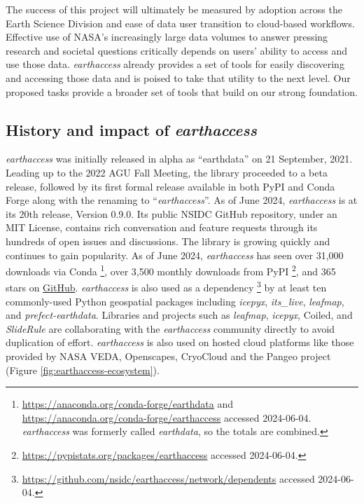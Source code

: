 \documentclass{ROSES-NASA-proposal}
\newcommand{\earthaccess}{\textit{earthaccess}\xspace} %
\begin{document}
The success of this project will ultimately be measured by adoption across the Earth Science Division and ease of data user transition to cloud-based workflows. Effective use of NASA's increasingly large data volumes to answer pressing research and societal questions critically depends on users' ability to access and use those data. \earthaccess already provides a set of tools for easily discovering and accessing those data and is poised to take that utility to the next level. Our proposed tasks provide a broader set of tools that build on our strong foundation.


\subsection{History and impact of \earthaccess} \label{history}

\earthaccess was initially released in alpha as “earthdata” on 21 September, 2021. Leading up to the 2022 AGU Fall Meeting, the library proceeded to a beta release, followed by its first formal release available in both PyPI and Conda Forge along with the renaming to ``\earthaccess''. As of June 2024, \earthaccess is at its 20th release, Version 0.9.0. Its public NSIDC GitHub repository, under an MIT License, contains rich conversation and feature requests through its hundreds of open issues and discussions. The library is growing quickly and continues to gain popularity. As of June 2024, \earthaccess has seen over 31,000 downloads via Conda \footnote{\url{https://anaconda.org/conda-forge/earthdata} and \url{https://anaconda.org/conda-forge/earthaccess} accessed 2024-06-04. \earthaccess was formerly called \textit{earthdata}, so the totals are combined.}, over 3,500 monthly downloads from PyPI \footnote{\url{https://pypistats.org/packages/earthaccess} accessed 2024-06-04.}, and 365 stars on \href{https://github.com/nsidc/earthaccess}{GitHub}. \earthaccess is also used as a dependency \footnote{\url{https://github.com/nsidc/earthaccess/network/dependents} accessed 2024-06-04.} by at least ten commonly-used Python geospatial packages including \textit{icepyx}, \textit{its\_live}, \textit{leafmap}, and \textit{prefect-earthdata}. Libraries and projects such as \textit{leafmap}, \textit{icepyx}, Coiled, and \textit{SlideRule} are collaborating with the \earthaccess community directly to avoid duplication of effort. \earthaccess is also used on hosted cloud platforms like those provided by NASA VEDA, Openscapes, CryoCloud and the Pangeo project (Figure \ref{fig:earthaccess-ecosystem}).
\end{document}
